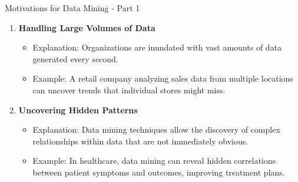 \documentclass[aspectratio=169]{beamer}
\begin{document}
\begin{frame}[fragile]{Motivations for Data Mining - Part 1}
    \begin{enumerate}
        \item \textbf{Handling Large Volumes of Data}  
        \begin{itemize}
            \item Explanation: Organizations are inundated with vast amounts of data generated every second.
            \item Example: A retail company analyzing sales data from multiple locations can uncover trends that individual stores might miss.
        \end{itemize}

        \item \textbf{Uncovering Hidden Patterns}
        \begin{itemize}
            \item Explanation: Data mining techniques allow the discovery of complex relationships within data that are not immediately obvious.
            \item Example: In healthcare, data mining can reveal hidden correlations between patient symptoms and outcomes, improving treatment plans.
        \end{itemize}
    \end{enumerate}
\end{frame}
\end{document}
